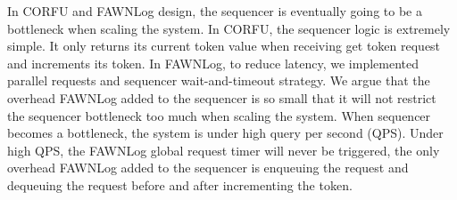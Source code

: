 \documentclass[letterpaper,twocolumn,10pt]{article}
\begin{document}
In CORFU and FAWNLog design, the sequencer is eventually going to be a bottleneck when scaling the system. In CORFU, the sequencer logic is extremely simple. It only returns its current token value when receiving get token request and increments its token. In FAWNLog, to reduce latency, we implemented parallel requests and sequencer wait-and-timeout strategy. We argue that the overhead FAWNLog added to the sequencer is so small that it will not restrict the sequencer bottleneck too much when scaling the system. When sequencer becomes a bottleneck, the system is under high query per second (QPS). Under high QPS, the FAWNLog global request timer will never be triggered, the only overhead FAWNLog added to the sequencer is enqueuing the request and dequeuing the request before and after incrementing the token. 

{\footnotesize 
}
\end{document}

